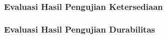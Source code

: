 \subsubsection{Evaluasi Hasil Pengujian Ketersediaan}

\subsubsection{Evaluasi Hasil Pengujian Durabilitas}


